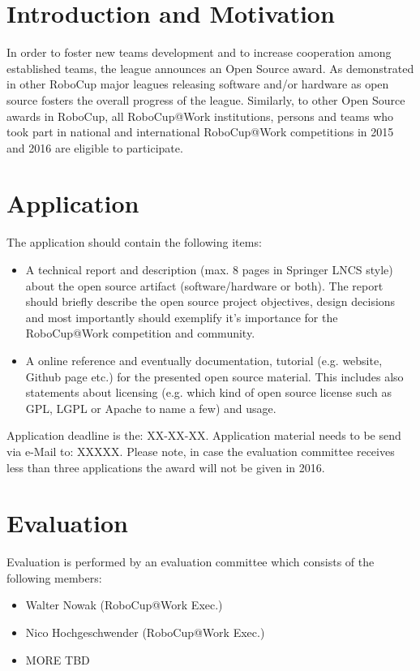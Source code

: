 \section{Introduction and Motivation}
In order to foster new teams development and to increase cooperation among established teams, the league announces an Open Source award. As demonstrated
in other RoboCup major leagues releasing software and/or hardware as open source fosters the overall progress of the league. Similarly, to other Open Source awards in RoboCup, all RoboCup@Work institutions, persons and teams who took part in national and international RoboCup@Work competitions in 2015 and 2016 are eligible to participate. 

\section{Application}
The application should contain the following items: 

\begin{itemize}
	\item A technical report and description (max. 8 pages in Springer LNCS style) about the open source artifact (software/hardware or both). The report should briefly describe the open source project objectives, design decisions and most importantly should exemplify it's importance for the RoboCup@Work competition and community.   
	\item A online reference and eventually documentation, tutorial (e.g. website, Github page etc.) for the presented open source material. This includes also statements about licensing (e.g. which kind of open source license such as GPL, LGPL or Apache to name a few) and usage.  
\end{itemize}

Application deadline is the: XX-XX-XX. Application material needs to be send via e-Mail to: XXXXX. Please note, in case the evaluation committee receives less than three applications the award will not be given in 2016. 

\section{Evaluation}
Evaluation is performed by an evaluation committee which consists of the following members:

\begin{itemize}
	\item Walter Nowak (RoboCup@Work Exec.)
	\item Nico Hochgeschwender (RoboCup@Work Exec.)
	\item MORE TBD
\end{itemize}

